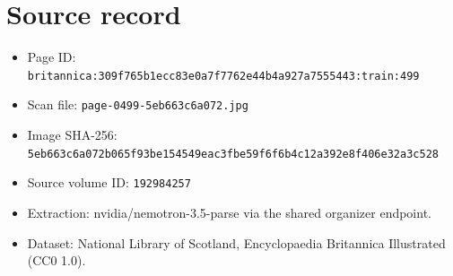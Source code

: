 \documentclass{article}
\begin{document}
\section*{Source record}
\begin{itemize}
\item Page ID: \texttt{britannica:309f765b1ecc83e0a7f7762e44b4a927a7555443:train:499}
\item Scan file: \texttt{page-0499-5eb663c6a072.jpg}
\item Image SHA-256: \texttt{5eb663c6a072b065f93be154549eac3fbe59f6f6b4c12a392e8f406e32a3c528}
\item Source volume ID: \texttt{192984257}
\item Extraction: nvidia/nemotron-3.5-parse via the shared organizer endpoint.
\item Dataset: National Library of Scotland, Encyclopaedia Britannica Illustrated (CC0 1.0).
\end{itemize}
\end{document}
